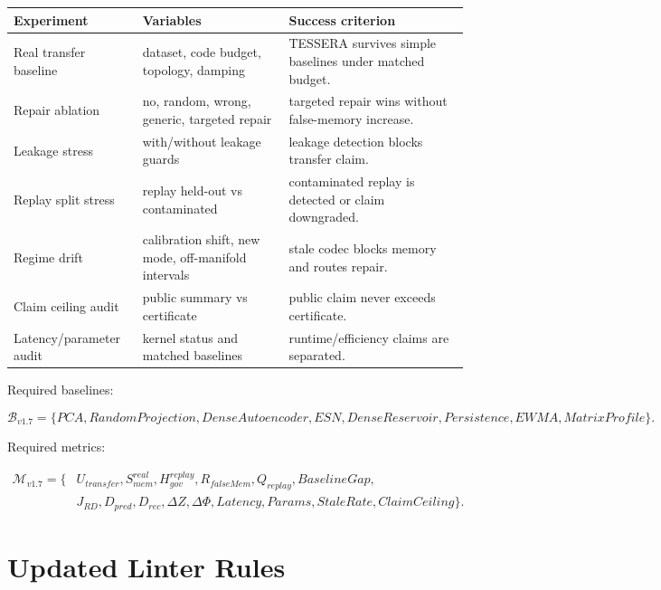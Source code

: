 \documentclass[12pt]{article}
\begin{document}
\begin{longtable}{p{}p{}p{}}
\toprule
\textbf{Experiment} & \textbf{Variables} & \textbf{Success criterion} \\
\midrule
Real transfer baseline & dataset, code budget, topology, damping & TESSERA survives simple baselines under matched budget. \\
Repair ablation & no, random, wrong, generic, targeted repair & targeted repair wins without false-memory increase. \\
Leakage stress & with/without leakage guards & leakage detection blocks transfer claim. \\
Replay split stress & replay held-out vs contaminated & contaminated replay is detected or claim downgraded. \\
Regime drift & calibration shift, new mode, off-manifold intervals & stale codec blocks memory and routes repair. \\
Claim ceiling audit & public summary vs certificate & public claim never exceeds certificate. \\
Latency/parameter audit & kernel status and matched baselines & runtime/efficiency claims are separated. \\
\bottomrule
\end{longtable}

Required baselines:

\[
\mathcal{B}_{v1.7}=\{PCA,RandomProjection,DenseAutoencoder,ESN,DenseReservoir,Persistence,EWMA,MatrixProfile\}.
\]

Required metrics:

\[
\begin{aligned}
\mathcal{M}_{v1.7}=\{&U_{transfer},S^{real}_{mem},H^{replay}_{gov},R_{falseMem},Q_{replay},
BaselineGap,\\
&J_{RD},D_{pred},D_{rec},\Delta Z,\Delta\Phi,Latency,Params,StaleRate,ClaimCeiling\}.
\end{aligned}
\]

\section{Updated Linter Rules}
\end{document}
